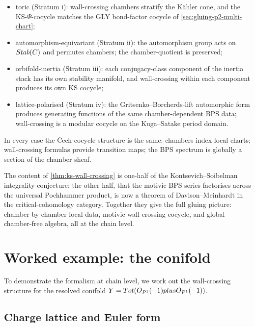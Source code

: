 \begin{itemize}[leftmargin=2em]
  \item toric (Stratum i): wall-crossing chambers stratify the K\"ahler
        cone, and the KS-$\Psi$-cocycle matches the GLY bond-factor cocycle
        of \cref{sec:gluing-p2-multi-chart};
  \item automorphism-equivariant (Stratum ii): the automorphism group acts
        on $Stab(C)$ and permutes chambers; the chamber-quotient is
        preserved;
  \item orbifold-inertia (Stratum iii): each conjugacy-class component of
        the inertia stack has its own stability manifold, and wall-crossing
        within each component produces its own KS cocycle;
  \item lattice-polarised (Stratum iv): the Gritsenko--Borcherds-lift
        automorphic form produces generating functions of the same
        chamber-dependent BPS data; wall-crossing is a modular cocycle on
        the Kuga--Satake period domain.
\end{itemize}

In every case the \v{C}ech-cocycle structure is the same: chambers index
local charts; wall-crossing formulas provide transition maps; the BPS
spectrum is globally a section of the chamber sheaf.

\begin{remark}
  The content of \cref{thm:ks-wall-crossing} is one-half of the
  Kontsevich--Soibelman integrality conjecture; the other half, that the
  motivic BPS series factorises across the universal Pochhammer product,
  is now a theorem of Davison--Meinhardt in the critical-cohomology
  category. Together they give the full gluing picture: chamber-by-chamber
  local data, motivic wall-crossing cocycle, and global chamber-free
  algebra, all at the chain level.
\end{remark}

\section{Worked example: the conifold}
\label{sec:wc-conifold}

To demonstrate the formalism at chain level, we work out the wall-crossing
structure for the resolved conifold
$Y = Tot(O_{P^1}(-1) plus O_{P^1}(-1))$.

\subsection{Charge lattice and Euler form}

